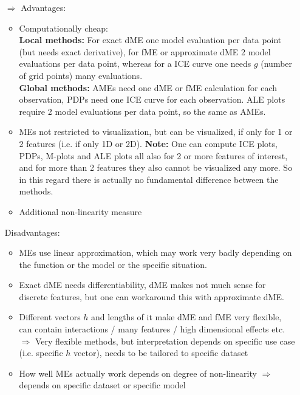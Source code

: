 \begin{enumerate}
    \begin{itemize}
        \item[$\Rightarrow$] Advantages:
        \begin{itemize}
            \item Computationally cheap:\\
            \textbf{Local methods:} For exact dME one model evaluation per data point (but needs exact derivative), for fME or approximate dME 2 model evaluations per data point, whereas for a ICE curve one needs $g$ (number of grid points) many evaluations. \\
            \textbf{Global methods:} AMEs need one dME or fME calculation for each observation, PDPs need one ICE curve for each observation. ALE plots require 2 model evaluations per data point, so the same as AMEs.
            \item MEs not restricted to visualization, but can be visualized, if only for 1 or 2 features (i.e. if only 1D or 2D).
            \textbf{Note:} One can compute ICE plots, PDPs, M-plots and ALE plots all also for 2 or more features of interest, and for more than 2 features they also cannot be visualized any more.
            So in this regard there is actually no fundamental difference between the methods.
            \item Additional non-linearity measure
        \end{itemize}
        Disadvantages:
        \begin{itemize}
            \item MEs use linear approximation, which may work very badly depending on the function or the model or the specific situation.
            \item Exact dME needs differentiability, dME makes not much sense for discrete features, but one can workaround this with approximate dME.
            \item Different vectors $h$ and lengths of it make dME and fME very flexible, can contain interactions / many features / high dimensional effects etc. \\
            $\Rightarrow$ Very flexible methods, but interpretation depends on specific use case (i.e. specific $h$ vector), needs to be tailored to specific dataset
            \item How well MEs actually work depends on degree of non-linearity
            $\Rightarrow$ depends on specific dataset or specific model

\end{itemize}
\end{itemize}
\end{enumerate}
